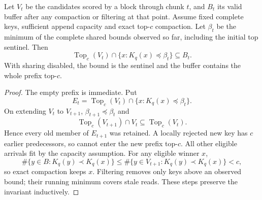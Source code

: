 \begin{resultblock}
\begin{lemma}
\label{lem:5-buffer}
Let $V_t$ be the candidates scored by a block through chunk $t$, and
$B_t$ its valid buffer after any compaction or filtering at that point.
Assume fixed complete keys, sufficient append capacity and exact
top-$c$ compaction. Let $\beta_t$ be the minimum of the complete shared
bounds observed so far, including the initial top sentinel. Then
\begin{equation}
 \operatorname{Top}_c(V_t)\cap\{x:K_q(x)\preceq\beta_t\}
 \subseteq B_t.
 \label{eq:5-buffer-invariant}
\end{equation}
With sharing disabled, the bound is the sentinel and the buffer contains
the whole prefix top-$c$.
\end{lemma}
\begin{proof}
The empty prefix is immediate. Put
\[
 E_t=\operatorname{Top}_c(V_t)\cap\{x:K_q(x)\preceq\beta_t\}.
\]
On extending $V_t$ to $V_{t+1}$, $\beta_{t+1}\preceq\beta_t$ and
\[
 \operatorname{Top}_c(V_{t+1})\cap V_t\subseteq\operatorname{Top}_c(V_t).
\]
Hence every old member of $E_{t+1}$ was retained. A locally rejected new key has $c$ earlier predecessors, so cannot enter the new prefix top-$c$. All other eligible arrivals fit by the capacity assumption. For any eligible winner $x$,
\[
 \#\{y\in B:K_q(y)\prec K_q(x)\}
 \leq\#\{y\in V_{t+1}:K_q(y)\prec K_q(x)\}<c,
\]
so exact compaction keeps $x$. Filtering removes only keys above an observed bound; their running minimum covers stale reads. These steps preserve the invariant inductively.
\end{proof}
\end{resultblock}

